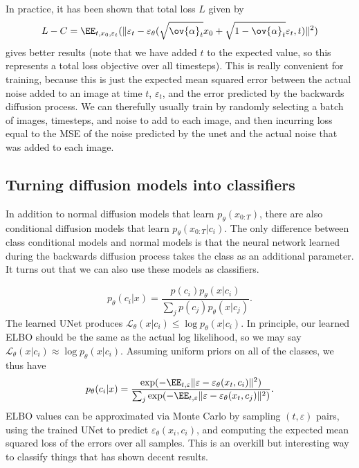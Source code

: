 In practice, it has been shown that total loss $L$ given by  
\[L - C = \EE_{t,x_0,\varepsilon_t}(\lVert\varepsilon_t - \varepsilon_{\theta}(\sqrt{\ov{\alpha}_t}x_0 + \sqrt{1-\ov{\alpha}_t}\varepsilon_t,t)\rVert^2)\] 
gives better results (note that we have added $t$ to the expected value, so this represents a total loss objective over all timesteps). This is really convenient for training, because this is just the expected mean squared error between the actual noise added to an image at time $t$, $\varepsilon_t$, and the error predicted by the backwards diffusion process. We can therefully usually train by randomly selecting a batch of images, timesteps, and noise to add to each image, and then incurring loss equal to the MSE of the noise predicted by the unet and the actual noise that was added to each image. 

\subsection{Turning diffusion models into classifiers}

In addition to normal diffusion models that learn $p_{\theta}(x_{0:T})$, there are also conditional diffusion models that learn $p_{\theta}(x_{0:T}|c_i)$. The only difference between class conditional models and normal models is that the neural network learned during the backwards diffusion process takes the class as an additional parameter. It turns out that we can also use these models as classifiers. 

\[p_{\theta}(c_i|x) = \frac{p(c_i)p_{\theta}(x|c_i)}{\sum_j p(c_j)p_{\theta}(x|c_j)}.\]
The learned UNet produces $\mathcal{L}_{\theta}(x|c_i)\leq \log p_{\theta}(x|c_i)$. In principle, our learned ELBO should be the same as the actual log likelihood, so we may say $\mathcal{L}_{\theta}(x|c_i)\approx \log p_{\theta}(x|c_i)$. Assuming uniform priors on all of the classes, we thus have 
\[p_{\theta}(c_i|x) = \frac{\exp(-\EE_{t,\varepsilon}\lVert \varepsilon - \varepsilon_{\theta}(x_t,c_i) \rVert^2)}{\sum_j \exp(-\EE_{t,\varepsilon}\lVert \varepsilon-\varepsilon_{\theta}(x_t,c_j)\rVert^2)}.\] 
ELBO values can be approximated via Monte Carlo by sampling $(t,\varepsilon)$ pairs, using the trained UNet to predict $\varepsilon_{\theta}(x_i,c_i)$, and computing the expected mean squared loss of the errors over all samples. This is an overkill but interesting way to classify things that has shown decent results. 
